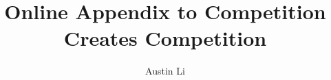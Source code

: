 \documentclass[
  11pt,
]{article}
\title{Online Appendix to Competition Creates Competition}
\author{Austin Li}
\date{}
\begin{document}
\hypertarget{stub-context}{}

\end{document}
